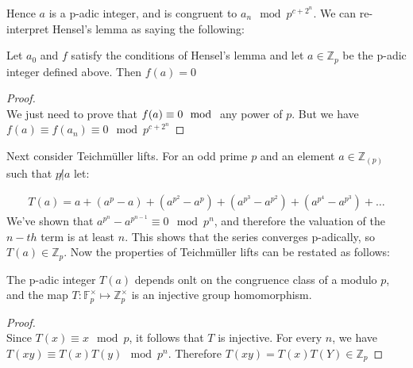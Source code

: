 \documentclass[11pt]{article}
\begin{document}
	Hence $a$ is a p-adic integer, and is congruent to $a_n \mod p^{c+2^n}$.
	We can re-interpret Hensel's lemma as saying the following:

\begin{proposition}
	Let $a_0$ and $f$ satisfy the conditions of Hensel's lemma and let $a \in \mathbb{Z}_p$ be the p-adic integer defined above. Then $f(a) = 0$
\end{proposition}

\begin{proof} $ $ \\
	We just need to prove that $f(a) \equiv 0 \mod $ any power of $p$. But we have $f(a) \equiv f(a_n) \equiv 0 \mod p^{c+2^n}$
\end{proof}

Next consider Teichm\"uller lifts. For an odd prime $p$ and an element $a \in \mathbb{Z}_{(p)}$ such that $p \not | a $ let:

\begin{align*}
	T(a) = a + (a^p - a) + (a^{p^2} - a^p) + (a^{p^3} - a^{p^2}) + (a^{p^4} - a^{p^3}) + \dots
\end{align*}
We've shown that $a^{p^n} - a^{p^{n-1}} \equiv 0 \mod p^n$, and therefore the valuation of the $n-th$ term is at least $n$. This shows that the series converges p-adically, so $T(a) \in \mathbb{Z}_p$. Now the properties of Teichm\"uller lifts can be restated as follows:

\begin{proposition}
	The p-adic integer $T(a)$ depends onlt on the congruence class of a modulo $p$, and the map $T \colon \mathbb{F}_p^\times \mapsto \mathbb{Z}^\times_p$ is an injective group homomorphism.
\end{proposition}

\begin{proof} $ $\\
	Since $T(x) \equiv x \mod p$, it follows that $T$ is injective. For every $n$, we have $T(xy) \equiv T(x)T(y) \mod p^n$. Therefore $T(xy) = T(x)T(Y) \in \mathbb{Z}_p$
\end{proof}
	
	
	
	
	
	
	
	
	
	
	
	
	
	
	
	
	
	

	
	
	
	
	
	
\end{document}
